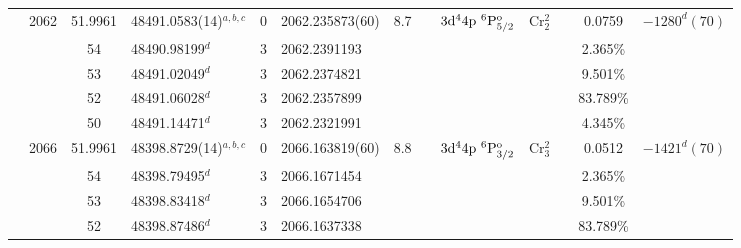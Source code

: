 \begin{table*}
\begin{center}
{\begin{tabular}{:l;l;c;l;c;l;c;l;l;c;c;c;c}
                                  & 2062   & 51.9961   & 48491.0583(14)$^{a,b,c}$         & 0 &   2062.235873(60)  &  8.7 & $                                        $ & $3\rm{d}^44\rm{p}~^6\rm{P}_{5/2}^{\rm o} $ & Cr$^2_{2}$  &              & 0.0759    & $-1280^{d}(70) $\\
\rowstyle{\itshape}               &        & 54        & 48490.98199$^{d}$                & 3 &  2062.2391193      &      & $                                        $ & $                                        $ &             &              & 2.365\%   & $     ^{}     $\\
\rowstyle{\itshape}               &        & 53        & 48491.02049$^{d}$                & 3 &  2062.2374821      &      & $                                        $ & $                                        $ &             &              & 9.501\%   & $     ^{}     $\\
\rowstyle{\itshape}               &        & 52        & 48491.06028$^{d}$                & 3 &  2062.2357899      &      & $                                        $ & $                                        $ &             &              & 83.789\%  & $     ^{}     $\\
\rowstyle{\itshape}               &        & 50        & 48491.14471$^{d}$                & 3 &  2062.2321991      &      & $                                        $ & $                                        $ &             &              & 4.345\%   & $     ^{}     $\\
                                  & 2066   & 51.9961   & 48398.8729(14)$^{a,b,c}$         & 0 &   2066.163819(60)  &  8.8 & $                                        $ & $3\rm{d}^44\rm{p}~^6\rm{P}_{3/2}^{\rm o} $ & Cr$^2_{3}$  &              & 0.0512    & $-1421^{d}(70) $\\
\rowstyle{\itshape}               &        & 54        & 48398.79495$^{d}$                & 3 &  2066.1671454      &      & $                                        $ & $                                        $ &             &              & 2.365\%   & $     ^{}     $\\
\rowstyle{\itshape}               &        & 53        & 48398.83418$^{d}$                & 3 &  2066.1654706      &      & $                                        $ & $                                        $ &             &              & 9.501\%   & $     ^{}     $\\
\rowstyle{\itshape}               &        & 52        & 48398.87486$^{d}$                & 3 &  2066.1637338      &      & $                                        $ & $                                        $ &             &              & 83.789\%  & $     ^{}     $\\

\end{tabular}}
\end{center}
\end{table*}
